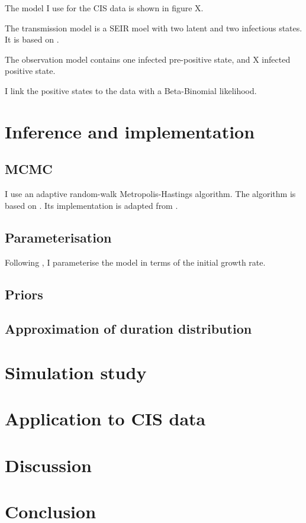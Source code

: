 \documentclass[thesis.tex]{subfiles}
\begin{document}
The model I use for the CIS data is shown in figure X.

The transmission model is a SEIR moel with two latent and two infectious states.
It is based on \textcite{birrellRealtime}.

The observation model contains one infected pre-positive state, and X infected positive state.

I link the positive states to the data with a Beta-Binomial likelihood.


\section{Inference and implementation} \label{SEIR:sec:inference-implementation}

\subsection{MCMC}

I use an adaptive random-walk Metropolis-Hastings algorithm.
The algorithm is based on \textcite[algorithm 4]{andrieuTutorial}.
Its implementation is adapted from \textcite{ghoshApproximate}.

\subsection{Parameterisation}

Following \textcite{birrellBayesian}, I parameterise the model in terms of the initial growth rate.


\subsection{Priors}

\subsection{Approximation of duration distribution}

\section{Simulation study} \label{SEIR:sec:sim-study}

\section{Application to CIS data} \label{SEIR:sec:application}

\section{Discussion} \label{SEIR:sec:discussion}

\section{Conclusion}
\end{document}
